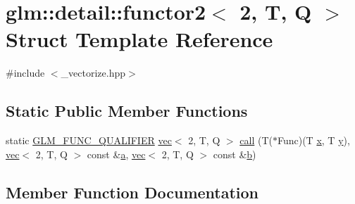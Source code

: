 \hypertarget{structglm_1_1detail_1_1functor2_3_012_00_01_t_00_01_q_01_4}{}\section{glm\+:\+:detail\+:\+:functor2$<$ 2, T, Q $>$ Struct Template Reference}
\label{structglm_1_1detail_1_1functor2_3_012_00_01_t_00_01_q_01_4}


{\ttfamily \#include $<$\+\_\+vectorize.\+hpp$>$}

\subsection*{Static Public Member Functions}
\begin{DoxyCompactItemize}
\item 
static \mbox{\hyperlink{setup_8hpp_a33fdea6f91c5f834105f7415e2a64407}{G\+L\+M\+\_\+\+F\+U\+N\+C\+\_\+\+Q\+U\+A\+L\+I\+F\+I\+ER}} \mbox{\hyperlink{structglm_1_1vec}{vec}}$<$ 2, T, Q $>$ \mbox{\hyperlink{structglm_1_1detail_1_1functor2_3_012_00_01_t_00_01_q_01_4_a861cd8867e8703fae7ff738403a9b50d}{call}} (T($\ast$Func)(T \mbox{\hyperlink{_s_d_l__opengl_8h_ad0e63d0edcdbd3d79554076bf309fd47}{x}}, T \mbox{\hyperlink{_s_d_l__opengl_8h_a1675d9d7bb68e1657ff028643b4037e3}{y}}), \mbox{\hyperlink{structglm_1_1vec}{vec}}$<$ 2, T, Q $>$ const \&\mbox{\hyperlink{_s_d_l__opengl__glext_8h_a3309789fc188587d666cda5ece79cf82}{a}}, \mbox{\hyperlink{structglm_1_1vec}{vec}}$<$ 2, T, Q $>$ const \&\mbox{\hyperlink{_s_d_l__opengl__glext_8h_a0f71581a41fd2264c8944126dabbd010}{b}})
\end{DoxyCompactItemize}


\subsection{Member Function Documentation}
\mbox{\label{structglm_1_1detail_1_1functor2_3_012_00_01_t_00_01_q_01_4_a861cd8867e8703fae7ff738403a9b50d}} 

